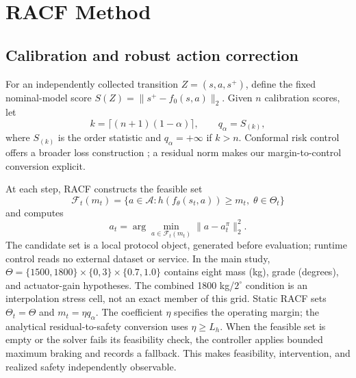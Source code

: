 \section{RACF Method}
\subsection{Calibration and robust action correction}
For an independently collected transition $Z=(s,a,s^+)$, define the fixed
nominal-model score $S(Z)=\|s^+-f_0(s,a)\|_2$. Given $n$ calibration
scores, let
\begin{equation}
 k=\lceil(n+1)(1-\alpha)\rceil,\qquad q_\alpha=S_{(k)},
 \label{eq:quantile}
\end{equation}
where $S_{(k)}$ is the order statistic and $q_\alpha=+\infty$ if $k>n$.
Conformal risk control offers a broader loss construction
\cite{angelopoulos2024crc}; a residual norm makes our
margin-to-control conversion explicit.

At each step, RACF constructs the feasible set
\begin{equation}
 \mathcal F_t(m_t)=\{a\in\mathcal A:
       h(f_\theta(s_t,a))\geq m_t,\;\theta\in\Theta_t\}
 \label{eq:feasible}
\end{equation}
and computes
\begin{equation}
 a_t=\arg\min_{a\in\mathcal F_t(m_t)}\|a-a_t^\pi\|_2^2.
 \label{eq:projection}
\end{equation}
The candidate set is a local protocol object, generated before evaluation;
runtime control reads no external dataset or service. In the main study,
$\Theta=\{1500,1800\}\!\times\!\{0,3\}\!\times\!\{0.7,1.0\}$
contains eight mass (kg), grade (degrees), and actuator-gain hypotheses.
The combined 1800 kg/$2^\circ$ condition is an interpolation stress cell,
not an exact member of this grid.
Static RACF sets $\Theta_t=\Theta$ and $m_t=\eta q_\alpha$.
The coefficient $\eta$ specifies the operating margin; the analytical
residual-to-safety conversion uses $\eta\geq L_h$.
When the feasible set is empty or the solver fails its feasibility check,
the controller applies bounded maximum braking and records a fallback.
This makes feasibility, intervention, and realized safety independently
observable.

